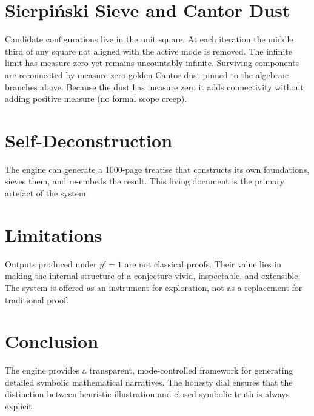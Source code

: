 \documentclass[11pt,a4paper]{article}
\begin{document}
\section{Sierpi\'nski Sieve and Cantor Dust}
Candidate configurations live in the unit square. At each iteration the middle third of any square not aligned with the active mode is removed. The infinite limit has measure zero yet remains uncountably infinite. Surviving components are reconnected by measure-zero golden Cantor dust pinned to the algebraic branches above. Because the dust has measure zero it adds connectivity without adding positive measure (no formal scope creep).

\section{Self-Deconstruction}
The engine can generate a 1000-page treatise that constructs its own foundations, sieves them, and re-embeds the result. This living document is the primary artefact of the system.

\section{Limitations}
Outputs produced under $y'=1$ are not classical proofs. Their value lies in making the internal structure of a conjecture vivid, inspectable, and extensible. The system is offered as an instrument for exploration, not as a replacement for traditional proof.

\section{Conclusion}
The engine provides a transparent, mode-controlled framework for generating detailed symbolic mathematical narratives. The honesty dial ensures that the distinction between heuristic illustration and closed symbolic truth is always explicit.
\end{document}
